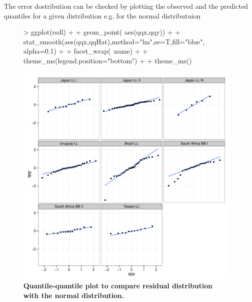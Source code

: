 \documentclass[shortnames,nojss,article]{jss}
\begin{document}
The error dostribution can be checked by plotting the observed and the predicted quantiles for a given distribution e.g. for the normal distributuion
\begin{figure}\begin{center}
\begin{Schunk}
\begin{Sinput}
> ggplot(rsdl)                                           +
+   geom_point( aes(qqx,qqy))                            +
+   stat_smooth(aes(qqx,qqHat),method="lm",se=T,fill="blue", alpha=0.1)         +
+   facet_wrap(~name)                                    +
+   theme_ms(legend.position="bottom")                   +
+              theme_ms()
\end{Sinput}
\end{Schunk}
\includegraphics{diags-016}
\caption{\bf{Quantile-quantile plot to compare residual distribution with the normal distribution.}}
\label{residual:4}
\end{center}\end{figure}
\end{document}
